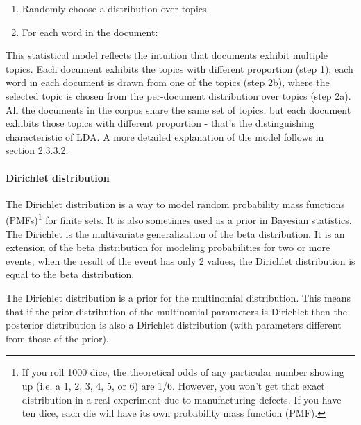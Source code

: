 \documentclass[12pt]{report}
\begin{document}
\begin{enumerate}
\item Randomly choose a distribution over topics.
\item For each word in the document:
\end{enumerate}


This statistical model reflects the intuition that documents exhibit multiple topics. 
Each document exhibits the topics with different proportion (step 1); each word in 
each document is drawn from one of the topics (step 2b), where the selected topic is 
chosen from the per-document distribution over topics (step 2a). All the documents 
in the corpus share the same set of topics, but each document exhibits those topics 
with different proportion - that’s the distinguishing characteristic of LDA. A more 
detailed explanation of the model follows in section 2.3.3.2.


\paragraph{Dirichlet distribution}


The Dirichlet distribution is a way to model random probability mass functions 
(PMFs)\footnote{If you roll 1000 dice, the theoretical odds of any particular 
number showing up (i.e. a 1, 2, 3, 4, 5, or 6) are 1/6. However, you won’t get 
that exact distribution in a real experiment due to manufacturing defects. If you 
have ten dice, each die will have its own probability mass function (PMF).} for 
finite sets. It is also sometimes used as a prior in Bayesian statistics. The 
Dirichlet is the multivariate generalization of the beta distribution. It is an 
extension of the beta distribution for modeling probabilities for two or more events; 
when the result of the event has only 2 values, the Dirichlet distribution is equal 
to the beta distribution.


The Dirichlet distribution is a prior for the multinomial distribution. This means 
that if the prior distribution of the multinomial parameters is Dirichlet then the 
posterior distribution is also a Dirichlet distribution (with parameters different 
from those of the prior).
\end{document}
